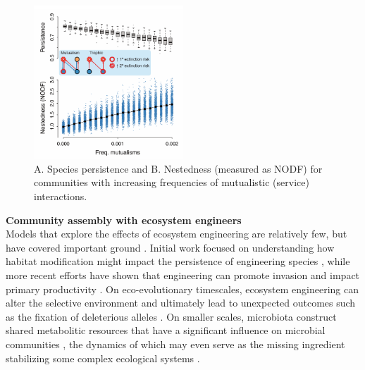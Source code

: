 \documentclass[9pt,twocolumn,twoside]{pnas-new}
\begin{document}
\begin{figure}
\centering
\includegraphics[width=0.5\textwidth]{fig_nested.pdf}
\caption{
A. Species persistence and
B. Nestedness (measured as NODF) for communities with increasing frequencies of mutualistic (service) interactions.
}
\label{fig:nest}
\end{figure}

\noindent \textbf{Community assembly with ecosystem engineers} \\
Models that explore the effects of ecosystem engineering are relatively few, but have covered important ground \cite{Hastings2007,OdlingSmee2013}.
Initial work focused on understanding how habitat modification might impact the persistence of engineering species \cite{Gurney1996}, while more recent efforts have shown that engineering can promote invasion \cite{Cuddington2004} and impact primary productivity \cite{Wright2004}.
On eco-evolutionary timescales, ecosystem engineering can alter the selective environment \cite{Krakauer2009,OdlingSmee2013} and ultimately lead to unexpected outcomes such as the fixation of deleterious alleles \cite{Laland1999}.
On smaller scales, microbiota construct shared metabolitic resources that have a significant influence on microbial communities \cite{Kallus2017}, the dynamics of which may even serve as the missing ingredient stabilizing some complex ecological systems \cite{Muscarella2017}.
\end{document}
